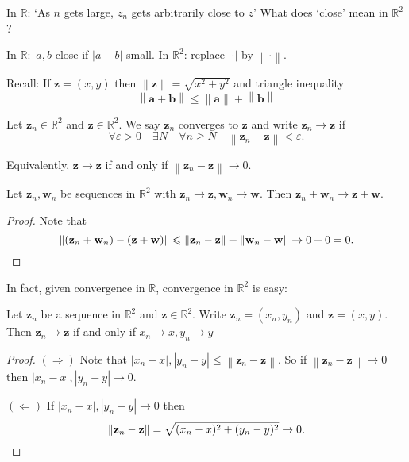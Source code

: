 \documentclass[a4paper]{article}
\renewcommand{\epsilon}{\varepsilon}
\begin{document}
In $\mathbb{R}$: `As $n$ gets large, $z_n$ gets arbitrarily close to $z$'
What does `close' mean in $ \mathbb{R}^{2}$?

In $\mathbb{R}:$ $a,b$ close if $|a-b|$ small. In $ \mathbb{R}^{2} $: replace $ |\cdot | $ by $ \left\| \cdot  \right\| $. 

Recall: If $\mathbf{z}=(x,y)$ then $ \left\| \mathbf{z} \right\| = \sqrt{x^2+y^2} $ and triangle inequality
\[
    \left\| \mathbf{a}+\mathbf{b} \right\| \le \left\| \mathbf{a} \right\| + \left\| \mathbf{b} \right\|
\]

\begin{definition}
    Let $\mathbf{z}_n\in \mathbb{R}^{2}$ and $\mathbf{z}\in \mathbb{R}^{2}$. We say $ \mathbf{z}_n $ converges to $\mathbf{z}$ and write $\mathbf{z}_n\to \mathbf{z}$ if 
    \[
        \forall \epsilon>0\quad \exists N\quad \forall n\ge N\quad \left\| \mathbf{z}_n-\mathbf{z} \right\| < \epsilon. 
    \]
\end{definition}
\begin{note}
    Equivalently, $ \mathbf{z}\to \mathbf{z} $ if and only if $ \left\| \mathbf{z}_n-\mathbf{z} \right\|\to 0 $. 
\end{note}

\begin{example}
    Let $ \mathbf{z}_n,\mathbf{w}_n $ be sequences in $ \mathbb{R}^{2} $ with $ \mathbf{z}_n\to \mathbf{z},\mathbf{w}_n\to \mathbf{w} $. Then $ \mathbf{z}_n+\mathbf{w}_n\to \mathbf{z}+\mathbf{w} $. 

    \begin{proof}
        Note that 
        \[
            \left\| (\mathbf{z}_n+\mathbf{w}_n)-(\mathbf{z}+\mathbf{w}) \right\|\le \left\| \mathbf{z}_n-\mathbf{z} \right\| + \left\| \mathbf{w}_n-\mathbf{w} \right\|\to 0+0=0. \qedhere
        \]
    \end{proof}
\end{example}
In fact, given convergence in $\mathbb{R}$, convergence in $ \mathbb{R}^{2} $ is easy: 
\begin{proposition}
    Let $ \mathbf{z}_n $ be a sequence in $ \mathbb{R}^{2} $ and $\mathbf{z}\in \mathbb{R}^{2}$. Write $ \mathbf{z}_n = (x_n,y_n) $ and $\mathbf{z} = (x,y)$. Then $ \mathbf{z}_n\to \mathbf{z} $ if and only if $ x_n\to x,y_n\to y $ 
\end{proposition}
\begin{proof}
    $ (\Rightarrow) $ Note that $ |x_n-x|,|y_n-y|\le \left\| \mathbf{z}_n-\mathbf{z} \right\| $. So if $ \left\| \mathbf{z}_n-\mathbf{z} \right\|\to 0 $ then $ |x_n-x|,|y_n-y|\to 0 $. 

    $ ( \Leftarrow) $ If $ |x_n-x|,|y_n-y|\to 0 $ then 
    \[
        \left\| \mathbf{z}_n-\mathbf{z} \right\| = \sqrt{(x_n-x)^2 + (y_n-y)^2}\to 0.\qedhere
    \]
\end{proof}
\end{document}
